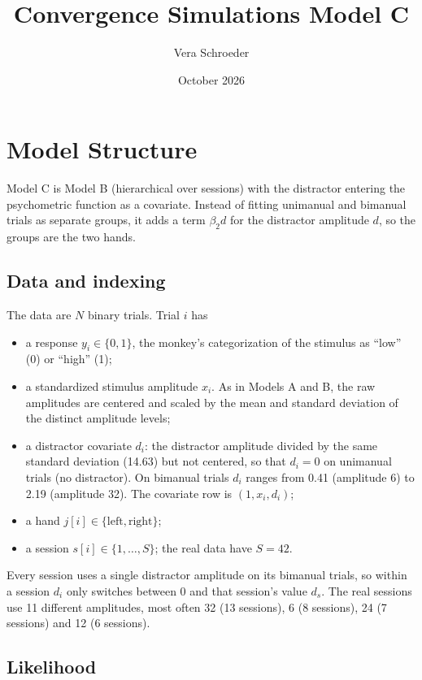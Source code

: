 \documentclass[11pt]{article}
\title{Convergence Simulations Model C}
\author{Vera Schroeder}
\date{October 2026}
\begin{document}
\maketitle


\section{Model Structure}

Model C is Model B (hierarchical over sessions) with the distractor entering the
psychometric function as a covariate. Instead of fitting unimanual and bimanual
trials as separate groups, it adds a term $\beta_2 d$ for the distractor
amplitude $d$, so the groups are the two hands.

\subsection{Data and indexing}
The data are $N$ binary trials. Trial $i$ has
\begin{itemize}
  \item a response $y_i \in \{0,1\}$, the monkey's categorization of the stimulus as ``low'' (0) or ``high'' (1);
  \item a standardized stimulus amplitude $x_i$. As in Models A and B, the raw
        amplitudes are centered and scaled by the mean and standard deviation of the
        distinct amplitude levels;
  \item a distractor covariate $d_i$: the distractor amplitude divided by the same
        standard deviation (14.63) but not centered, so that $d_i = 0$ on unimanual
        trials (no distractor). On bimanual trials $d_i$ ranges from 0.41
        (amplitude 6) to 2.19 (amplitude 32). The covariate row is
        $(1, x_i, d_i)$;
  \item a hand $j[i] \in \{\text{left}, \text{right}\}$;
  \item a session $s[i] \in \{1,\dots,S\}$; the real data have $S = 42$.
\end{itemize}
Every session uses a single distractor amplitude on its bimanual trials, so within a
session $d_i$ only switches between 0 and that session's value $d_s$. The real
sessions use 11 different amplitudes, most often 32 (13 sessions), 6 (8 sessions),
24 (7 sessions) and 12 (6 sessions).

\subsection{Likelihood}
\end{document}
